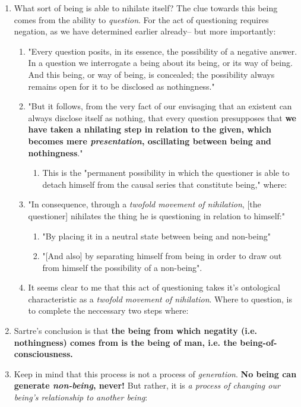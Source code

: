 \begin{enumerate}
  \item What sort of being is able to nihilate itself? The clue towards this being comes from the ability to \emph{question}. For the act of questioning requires negation, as we have determined earlier already-- but more importantly:
  \begin{enumerate}
    \item "Every question posits, in its essence, the possibility of a negative answer. In a question we interrogate a being about its being, or its way of being. And this being, or way of being, is concealed; the possibility always remains open for it to be disclosed as nothingness."
    \item "But it follows, from the very fact of our envisaging that an existent can always disclose itself as nothing, that every question presupposes that \textbf{we have taken a nhilating step in relation to the given, which becomes mere \emph{presentation}, oscillating between being and nothingness}." \autocite[59]{sartre}
    \begin{enumerate}
      \item This is the "permanent possibility in which the questioner is able to detach himself from the causal series that constitute being," where:
    \end{enumerate}
    \item "In consequence, through a \emph{twofold movement of nihilation}, [the questioner] nihilates the thing he is questioning in relation to himself:"
    \begin{enumerate}
      \item "By placing it in a neutral state between being and non-being"
      \item "[And also] by separating himself from being in order to draw out from himself the possibility of a non-being". \autocite[59]{sartre}
    \end{enumerate}
    \item It seems clear to me that this act of questioning takes it's ontological characteristic as a \emph{twofold movement of nihilation}. Where to question, is to complete the neccessary two steps where:
  \end{enumerate}
  \item Sartre's conclusion is that \textbf{the being from which negatity (i.e. nothingness) comes from is the being of man, i.e. the being-of-consciousness.}
  \item Keep in mind that this process is not a process of \emph{generation}. \textbf{No being can generate \emph{non-being}, never!} But rather, it is \emph{a process of changing our being's relationship to another being}:

\end{enumerate}

